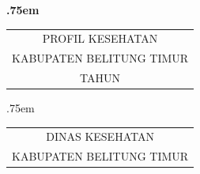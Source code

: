\begin{titlepage}
    \begin{center}
        
        \vspace*{48ex}
            
        {\LARGE \bfseries
        	\lineskip .75em%
        	\begin{tabular}[t]{c}%
        		PROFIL KESEHATAN\\KABUPATEN BELITUNG TIMUR\\TAHUN \tPnos{}
        	\end{tabular}\par}%
            
            
        \vspace{3ex}
        {\large
        	\lineskip .75em%
        	\begin{tabular}[t]{c}%
        		DINAS KESEHATAN\\KABUPATEN BELITUNG TIMUR
        	\end{tabular}\par}%
            
            
        \vspace{1.5ex}
    \end{center}
\end{titlepage}